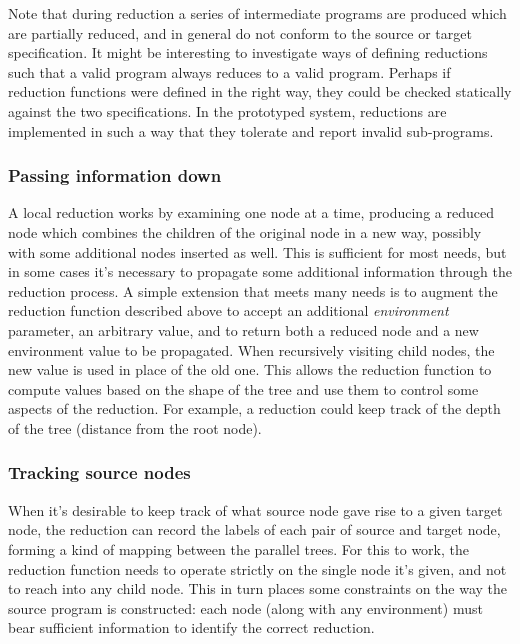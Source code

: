 
Note that during reduction a series of intermediate programs are produced which are partially reduced, and in general do not conform to the source or target specification. It might be interesting to investigate ways of defining reductions such that a valid program always reduces to a valid program. Perhaps if reduction functions were defined in the right way, they could be checked statically against the two specifications. In the prototyped system, reductions are implemented in such a way that they tolerate and report invalid sub-programs.


\subsubsection{Passing information down}
A local reduction works by examining one node at a time, producing a reduced node which combines the children of the original node in a new way, possibly with some additional nodes inserted as well. This is sufficient for most needs, but in some cases it's necessary to propagate some additional information through the reduction process. A simple extension that meets many needs is to augment the reduction function described above to accept an additional \emph{environment} parameter, an arbitrary value, and to return both a reduced node and a new environment value to be propagated. When recursively visiting child nodes, the new value is used in place of the old one. This allows the reduction function to compute values based on the shape of the tree and use them to control some aspects of the reduction. For example, a reduction could keep track of the depth of the tree (distance from the root node).



\subsubsection{Tracking source nodes}
When it's desirable to keep track of what source node gave rise to a given target node, the reduction can record the labels of each pair of source and target node, forming a kind of mapping between the parallel trees. For this to work, the reduction function needs to operate strictly on the single node it's given, and not to reach into any child node. This in turn places some constraints on the way the source program is constructed: each node (along with any environment) must bear sufficient information to identify the correct reduction.

